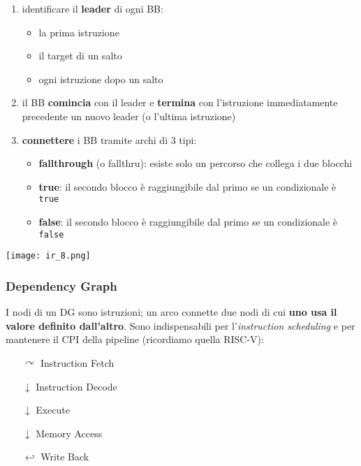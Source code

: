 \noindent\begin{minipage}[c]{.65\textwidth}
\begin{enumerate}
  \item identificare il \textbf{leader} di ogni BB:
    \begin{itemize}
      \item la prima istruzione
      \item il target di un salto
      \item ogni istruzione dopo un salto
    \end{itemize}
  \item il BB \textbf{comincia} con il leader e \textbf{termina} con l'istruzione immediatamente precedente un nuovo leader (o l'ultima istruzione)
  \item \textbf{connettere} i BB tramite archi di 3 tipi:
    \begin{itemize}
      \item \textbf{fallthrough} (o fallthru): esiste solo un percorso che collega i due blocchi
      \item \textbf{true}: il secondo blocco \`e raggiungibile dal primo se un condizionale \`e \lstinline|true|
      \item \textbf{false}: il secondo blocco \`e raggiungibile dal primo se un condizionale \`e \lstinline|false|
    \end{itemize}
\end{enumerate}
\end{minipage}\hfill
\begin{minipage}[c]{.3\textwidth}
\texttt{[image: ir\_8.png]}
\end{minipage}

\subsubsection{Dependency Graph}

I nodi di un DG sono istruzioni; un arco connette due nodi di cui \textbf{uno usa il valore definito dall'altro}. Sono indispensabili per l'\textit{instruction scheduling} e per mantenere il CPI della pipeline (ricordiamo quella RISC-V):

\begin{itemize}
  \item[$\curvearrowright$] Instruction Fetch
  \item[$\downarrow$] Instruction Decode
  \item[$\downarrow$] Execute
  \item[$\downarrow$] Memory Access
  \item[$\hookleftarrow$] Write Back
\end{itemize}



